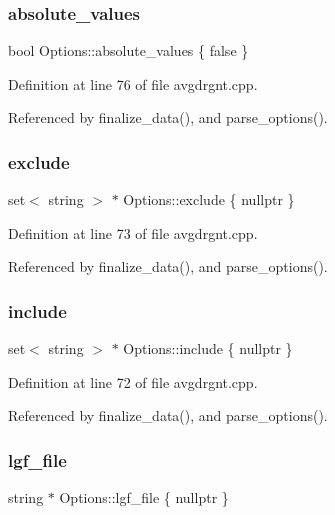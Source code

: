 \subsubsection{\texorpdfstring{absolute\+\_\+values}{absolute\_values}}
{\footnotesize\ttfamily bool Options\+::absolute\+\_\+values \{ false \}}



Definition at line 76 of file avgdrgnt.\+cpp.



Referenced by finalize\+\_\+data(), and parse\+\_\+options().

\mbox{\label{structOptions_a0b4e7353a06f655fb83a2402ed52ecd0}} 
\subsubsection{\texorpdfstring{exclude}{exclude}}
{\footnotesize\ttfamily set$<$ string $>$ $\ast$ Options\+::exclude \{ nullptr \}}



Definition at line 73 of file avgdrgnt.\+cpp.



Referenced by finalize\+\_\+data(), and parse\+\_\+options().

\mbox{\label{structOptions_a90ea5ea52a8010baead4fa1c9b587b6f}} 
\subsubsection{\texorpdfstring{include}{include}}
{\footnotesize\ttfamily set$<$ string $>$ $\ast$ Options\+::include \{ nullptr \}}



Definition at line 72 of file avgdrgnt.\+cpp.



Referenced by finalize\+\_\+data(), and parse\+\_\+options().

\mbox{\label{structOptions_ab1d4dd586f45745c976ef7fcd2536221}} 
\subsubsection{\texorpdfstring{lgf\+\_\+file}{lgf\_file}}
{\footnotesize\ttfamily string $\ast$ Options\+::lgf\+\_\+file \{ nullptr \}}



